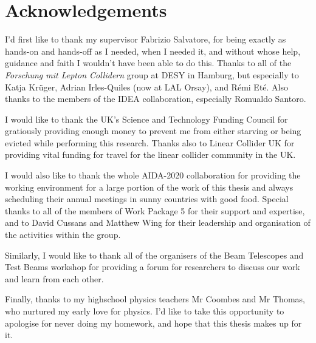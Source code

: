 \chapter*{Acknowledgements}

 

I'd first like to thank my supervisor Fabrizio Salvatore, for being exactly as hands-on and hands-off as I needed, when I needed it, and without whose help, guidance and faith I wouldn't have been able to do this. Thanks to all of the \emph{Forschung mit Lepton Collidern} group at DESY in Hamburg, but especially to Katja Kr\"{u}ger, Adrian Irles-Quiles (now at LAL Orsay), and R\'{e}mi Et\'{e}. Also thanks to the members of the IDEA collaboration, especially Romualdo Santoro. \newline %

I would like to thank the UK's Science and Technology Funding Council for gratiously providing enough money to prevent me from either starving or being evicted while performing this research. Thanks also to Linear Collider UK for providing vital funding for travel for the linear collider community in the UK. \newline

I would also like to thank the whole AIDA-2020 collaboration for providing the working environment for a large portion of the work of this thesis and always scheduling their annual meetings in sunny countries with good food. Special thanks to all of the members of Work Package 5 for their support and expertise, and to David Cussans and Matthew Wing for their leadership and organisation of the activities within the group.

Similarly, I would like to thank all of the organisers of the Beam Telescopes and Test Beams workshop for providing a forum for researchers to discuss our work and learn from each other. \newline

Finally, thanks to my highschool physics teachers Mr Coombes and Mr Thomas, who nurtured my early love for physics. I'd like to take this opportunity to apologise for never doing my homework, and hope that this thesis makes up for it.